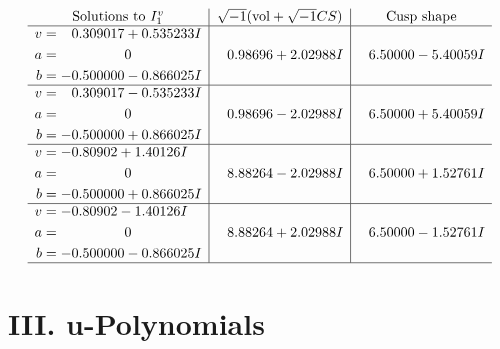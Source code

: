 \documentclass[1p]{elsarticle_modified}
\theoremstyle{definition}
\newcommand{\I}{\sqrt{-1}}
\begin{document}
$$\begin{array}{c|c|c}  
\text{Solutions to }I^v_{1}& \I (\text{vol} + \sqrt{-1}CS) & \text{Cusp shape}\\
 \hline 
\begin{aligned}
v &= \phantom{-}0.309017 + 0.535233 I \\
a &= \phantom{-0.000000 } 0 \\
b &= -0.500000 - 0.866025 I\end{aligned}
 & \phantom{-}0.98696 + 2.02988 I & \phantom{-}6.50000 - 5.40059 I \\ \hline\begin{aligned}
v &= \phantom{-}0.309017 - 0.535233 I \\
a &= \phantom{-0.000000 } 0 \\
b &= -0.500000 + 0.866025 I\end{aligned}
 & \phantom{-}0.98696 - 2.02988 I & \phantom{-}6.50000 + 5.40059 I \\ \hline\begin{aligned}
v &= -0.80902 + 1.40126 I \\
a &= \phantom{-0.000000 } 0 \\
b &= -0.500000 + 0.866025 I\end{aligned}
 & \phantom{-}8.88264 - 2.02988 I & \phantom{-}6.50000 + 1.52761 I \\ \hline\begin{aligned}
v &= -0.80902 - 1.40126 I \\
a &= \phantom{-0.000000 } 0 \\
b &= -0.500000 - 0.866025 I\end{aligned}
 & \phantom{-}8.88264 + 2.02988 I & \phantom{-}6.50000 - 1.52761 I\\
 \hline 
 \end{array}$$\newpage
\newpage\renewcommand{\arraystretch}{1}
\centering \section*{ III. u-Polynomials}
\end{document}
